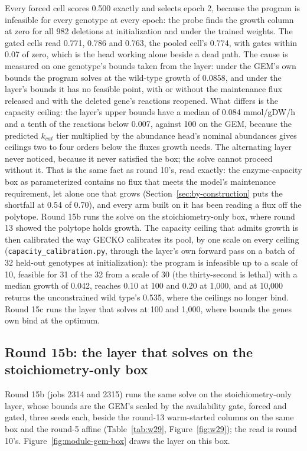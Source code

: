 Every forced cell scores 0.500 exactly and selects epoch 2, because the program is
infeasible for every genotype at every epoch: the probe finds the growth column at zero
for all 982 deletions at initialization and under the trained weights. The gated cells
read 0.771, 0.786 and 0.763, the pooled cell's 0.774, with gates within 0.07 of zero,
which is the head working alone beside a dead path. The cause is measured on one
genotype's bounds taken
from the layer: under the GEM's own bounds the program solves at the wild-type growth of
0.0858, and under the layer's bounds it has no feasible point, with or without the
maintenance flux released and with the deleted gene's reactions reopened. What differs
is the capacity ceiling: the layer's upper bounds have a median of 0.084 mmol/gDW/h and
a tenth of the reactions below 0.007, against 100 on the GEM, because the predicted
$k_{cat}$ tier multiplied by the abundance head's nominal abundances gives ceilings two
to four orders below the fluxes growth needs. The alternating layer never noticed,
because it never satisfied the box; the solve cannot proceed without it. That is the
same fact as round 10's, read exactly: the enzyme-capacity box as parameterized contains
no flux that meets the model's maintenance requirement, let alone one that grows
(Section~\ref{sec:by-construction} puts the shortfall at 0.54 of 0.70), and every arm
built on it has been reading a flux off the polytope.
Round 15b runs the solve on the stoichiometry-only box, where round 13 showed the
polytope holds growth. The capacity ceiling that admits growth is then calibrated the
way GECKO calibrates its pool, by one scale on every ceiling
(\texttt{capacity\_calibration.py}, through the layer's own forward pass on a batch of
32 held-out genotypes at initialization): the program is infeasible up to a scale of
10, feasible for 31 of the 32 from a scale of 30 (the thirty-second is lethal) with a
median growth of 0.042, reaches 0.10 at 100 and 0.20 at 1,000, and at 10,000 returns
the unconstrained wild type's 0.535, where the ceilings no longer bind. Round 15c runs
the layer that solves at 100 and 1,000, where bounds the genes own bind at the optimum.

\subsection{Round 15b: the layer that solves on the stoichiometry-only box}

Round 15b (jobs 2314 and 2315) runs the same solve on the stoichiometry-only layer,
whose bounds are the GEM's scaled by the availability gate, forced and gated, three
seeds each, beside the round-13 warm-started columns on the same box and the round-5
affine (Table~\ref{tab:w29}, Figure~\ref{fig:w29}); the read is round 10's.
Figure~\ref{fig:module-gem-box} draws the layer on this box.


